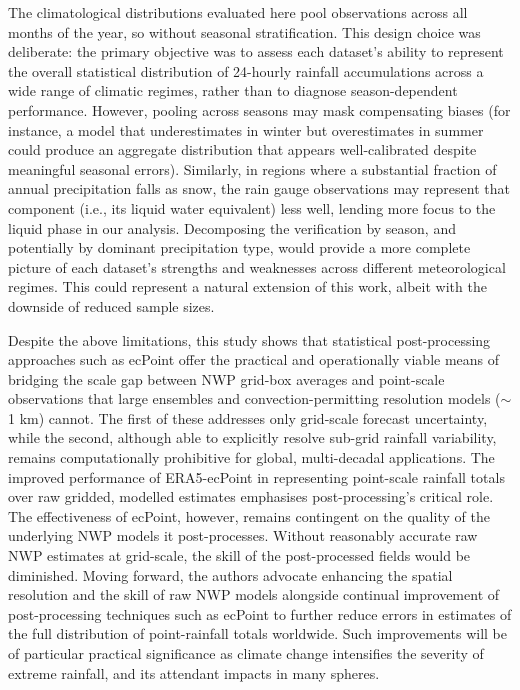 \documentclass{ametsocV6.1}
\begin{document}
The climatological distributions evaluated here pool observations across all months of the year, so without seasonal stratification. This design choice was deliberate: the primary objective was to assess each dataset's ability to represent the overall statistical distribution of 24-hourly rainfall accumulations across a wide range of climatic regimes, rather than to diagnose season-dependent performance. However, pooling across seasons may mask compensating biases (for instance, a model that underestimates in winter but overestimates in summer could produce an aggregate distribution that appears well-calibrated despite meaningful seasonal errors). Similarly, in regions where a substantial fraction of annual precipitation falls as snow, the rain gauge observations may represent that component (i.e., its liquid water equivalent) less well, lending more focus to the liquid phase in our analysis. Decomposing the verification by season, and potentially by dominant precipitation type, would provide a more complete picture of each dataset's strengths and weaknesses across different meteorological regimes. This could represent a natural extension of this work, albeit with the downside of reduced sample sizes.

Despite the above limitations, this study shows that statistical post-processing approaches such as ecPoint offer the practical and operationally viable means of bridging the scale gap between NWP grid-box averages and point-scale observations that large ensembles and convection-permitting resolution models ($\sim$1 km) cannot. The first of these addresses only grid-scale forecast uncertainty, while the second, although able to explicitly resolve sub-grid rainfall variability, remains computationally prohibitive for global, multi-decadal applications. The improved performance of ERA5-ecPoint in representing point-scale rainfall totals over raw gridded, modelled estimates emphasises post-processing's critical role. The effectiveness of ecPoint, however, remains contingent on the quality of the underlying NWP models it post-processes. Without reasonably accurate raw NWP estimates at grid-scale, the skill of the post-processed fields would be diminished. Moving forward, the authors advocate enhancing the spatial resolution and the skill of raw NWP models alongside continual improvement of post-processing techniques such as ecPoint to further reduce errors in estimates of the full distribution of point-rainfall totals worldwide. Such improvements will be of particular practical significance as climate change intensifies the severity of extreme rainfall, and its attendant impacts in many spheres.
\end{document}
